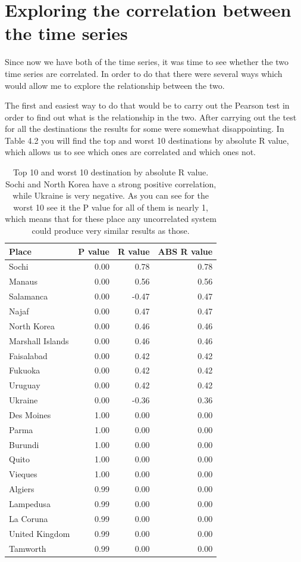 \documentclass[minf,frontabs,twoside,singlespacing,parskip]{infthesis}
\begin{document}
\section{Exploring the correlation between the time series}

Since now we have both of the time series, it was time to see whether the two time series are correlated. In order to do that there were several ways which would allow me to explore the relationship between the two. 


The first and easiest way to do that would be to carry out the Pearson test in order to find out what is the relationship in the two. After carrying out the test for all the destinations the results for some were somewhat disappointing.  In Table 4.2 you will find the top and worst 10 destinations by absolute R value, which allows us to see which ones are correlated and which ones not.


\begin{table}[p!]
\begin{center}
\begin{tabular}{ l | r | r | r}
\textbf{Place} & \textbf{P value} & \textbf{R value} & \textbf{ABS R value}\\
\hline
Sochi & 0.00 & 0.78 & 0.78\\
Manaus & 0.00 & 0.56 & 0.56\\
Salamanca & 0.00 & -0.47 & 0.47\\
Najaf & 0.00 & 0.47 & 0.47\\
North Korea & 0.00 & 0.46 & 0.46\\
Marshall Islands & 0.00 & 0.46 & 0.46\\
Faisalabad & 0.00 & 0.42 & 0.42\\
Fukuoka & 0.00 & 0.42 & 0.42\\
Uruguay & 0.00 & 0.42 & 0.42\\
Ukraine & 0.00 & -0.36 & 0.36 \\
\hline
\hline
Des Moines & 1.00 & 0.00 & 0.00\\
Parma & 1.00 & 0.00 & 0.00\\
Burundi & 1.00 & 0.00 & 0.00\\
Quito & 1.00 & 0.00 & 0.00\\
Vieques & 1.00 & 0.00 & 0.00\\
Algiers & 0.99 & 0.00 & 0.00\\
Lampedusa & 0.99 & 0.00 & 0.00\\
La Coruna & 0.99 & 0.00 & 0.00\\
United Kingdom & 0.99 & 0.00 & 0.00\\
Tamworth & 0.99 & 0.00 & 0.00\\
\end{tabular}
\end{center}
\caption{Top 10 and worst 10 destination by absolute R value. Sochi and North Korea have a strong positive correlation, while Ukraine is very negative. As you can see for the worst 10 see it the P value for all of them is nearly 1, which means that for these place any uncorrelated system could produce very similar results as those. }
\end{table}
\end{document}
